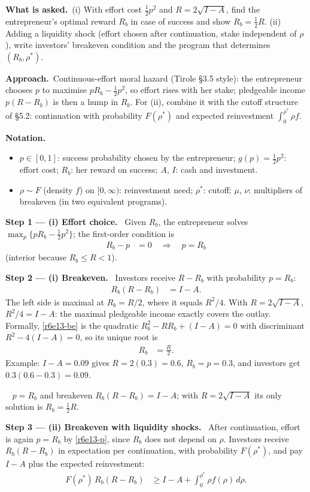 \documentclass[11pt,a4paper]{article}
\newcommand{\notation}{\par\noindent\textbf{Notation.}}
\newcommand{\step}[2]{\par\medskip\noindent\textbf{Step #1 --- #2.}~}
\newcommand{\asked}{\par\medskip\noindent\textbf{What is asked.}~}
\newcommand{\approach}{\par\smallskip\noindent\textbf{Approach.}~}
\newcommand{\answer}[1]{\par\smallskip\noindent\fbox{\textbf{Answer #1.}}~}
\begin{document}
\asked (i) With effort cost $\tfrac12p^2$ and $R=2\sqrt{I-A}$, find the entrepreneur's optimal reward $R_b$ in case of success and show $R_b=\tfrac12R$. (ii) Adding a liquidity shock (effort chosen after continuation, stake independent of $\rho$), write investors' breakeven condition and the program that determines $(R_b,\rho^*)$.

\approach Continuous-effort moral hazard (Tirole \S 3.5 style): the entrepreneur chooses $p$ to maximise $pR_b-\tfrac12p^2$, so effort rises with her stake; pledgeable income $p(R-R_b)$ is then a hump in $R_b$. For (ii), combine it with the cutoff structure of \S 5.2: continuation with probability $F(\rho^*)$ and expected reinvestment $\int_0^{\rho^*}\rho f$.

\notation
\begin{itemize}
  \item $p\in[0,1]$: success probability chosen by the entrepreneur; $g(p)=\tfrac12p^2$: effort cost; $R_b$: her reward on success; $A$, $I$: cash and investment.
  \item $\rho\sim F$ (density $f$) on $[0,\infty)$: reinvestment need; $\rho^*$: cutoff; $\mu$, $\nu$: multipliers of breakeven (in two equivalent programs).
\end{itemize}

\step{1}{(i) Effort choice} Given $R_b$, the entrepreneur solves $\max_p\{pR_b-\tfrac12p^2\}$; the first-order condition is
\begin{align}
  R_b-p &= 0 \quad\Longrightarrow\quad p=R_b \label{r6e13-p}
\end{align}
(interior because $R_b\le R<1$).

\step{2}{(i) Breakeven} Investors receive $R-R_b$ with probability $p=R_b$:
\begin{align}
  R_b(R-R_b) &= I-A. \label{r6e13-be}
\end{align}
The left side is maximal at $R_b=R/2$, where it equals $R^2/4$. With $R=2\sqrt{I-A}$, $R^2/4=I-A$: the maximal pledgeable income exactly covers the outlay. Formally, \eqref{r6e13-be} is the quadratic $R_b^2-RR_b+(I-A)=0$ with discriminant $R^2-4(I-A)=0$, so its unique root is
\begin{align}
  R_b &= \frac{R}{2}. \label{r6e13-Rb}
\end{align}
Example: $I-A=0.09$ gives $R=2(0.3)=0.6$, $R_b=p=0.3$, and investors get $0.3(0.6-0.3)=0.09$.
\answer{(i)} $p=R_b$ and breakeven $R_b(R-R_b)=I-A$; with $R=2\sqrt{I-A}$ its only solution is $R_b=\tfrac12R$.

\step{3}{(ii) Breakeven with liquidity shocks} After continuation, effort is again $p=R_b$ by \eqref{r6e13-p}, since $R_b$ does not depend on $\rho$. Investors receive $R_b(R-R_b)$ in expectation per continuation, with probability $F(\rho^*)$, and pay $I-A$ plus the expected reinvestment:
\begin{align}
  F(\rho^*)\,R_b(R-R_b) &\ge I-A+\int_0^{\rho^*}\rho f(\rho)\,d\rho. \label{r6e13-be2}
\end{align}
\end{document}
